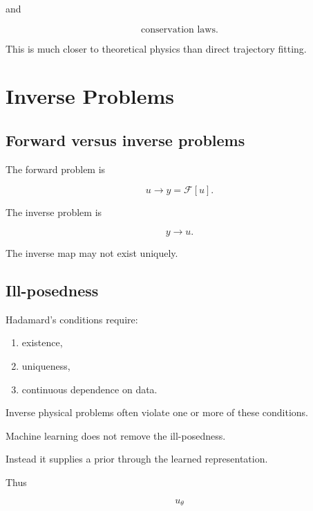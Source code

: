 \documentclass[11pt,a4paper,oneside]{book}
\begin{document}
and

\begin{equation}
\text{conservation laws}.
\end{equation}

This is much closer to theoretical physics than direct trajectory fitting.

\chapter{Inverse Problems}

\section{Forward versus inverse problems}

The forward problem is

\begin{equation}
u
\longrightarrow
y=\mathcal{F}[u].
\end{equation}

The inverse problem is

\begin{equation}
y
\longrightarrow
u.
\end{equation}

The inverse map may not exist uniquely.

\section{Ill-posedness}

Hadamard's conditions require:

\begin{enumerate}
\item existence,
\item uniqueness,
\item continuous dependence on data.
\end{enumerate}

Inverse physical problems often violate one or more of these conditions.

Machine learning does not remove the ill-posedness.

Instead it supplies a prior through the learned representation.

Thus

\begin{equation}
u_\theta
\end{equation}
\end{document}
